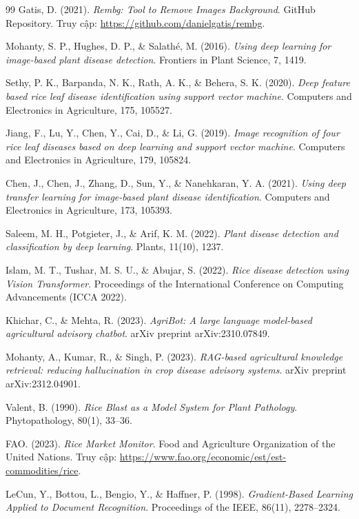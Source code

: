 \documentclass[13pt,a4paper]{extreport}
\begin{document}
\begin{thebibliography}{99}
Gatis, D. (2021). \textit{Rembg: Tool to Remove Images Background}. GitHub Repository. Truy cập: \url{https://github.com/danielgatis/rembg}.

Mohanty, S. P., Hughes, D. P., \& Salath\'e, M. (2016). \textit{Using deep learning for image-based plant disease detection}. Frontiers in Plant Science, 7, 1419.

Sethy, P. K., Barpanda, N. K., Rath, A. K., \& Behera, S. K. (2020). \textit{Deep feature based rice leaf disease identification using support vector machine}. Computers and Electronics in Agriculture, 175, 105527.

Jiang, F., Lu, Y., Chen, Y., Cai, D., \& Li, G. (2019). \textit{Image recognition of four rice leaf diseases based on deep learning and support vector machine}. Computers and Electronics in Agriculture, 179, 105824.

Chen, J., Chen, J., Zhang, D., Sun, Y., \& Nanehkaran, Y. A. (2021). \textit{Using deep transfer learning for image-based plant disease identification}. Computers and Electronics in Agriculture, 173, 105393.

Saleem, M. H., Potgieter, J., \& Arif, K. M. (2022). \textit{Plant disease detection and classification by deep learning}. Plants, 11(10), 1237.

Islam, M. T., Tushar, M. S. U., \& Abujar, S. (2022). \textit{Rice disease detection using Vision Transformer}. Proceedings of the International Conference on Computing Advancements (ICCA 2022).

Khichar, C., \& Mehta, R. (2023). \textit{AgriBot: A large language model-based agricultural advisory chatbot}. arXiv preprint arXiv:2310.07849.

Mohanty, A., Kumar, R., \& Singh, P. (2023). \textit{RAG-based agricultural knowledge retrieval: reducing hallucination in crop disease advisory systems}. arXiv preprint arXiv:2312.04901.

Valent, B. (1990). \textit{Rice Blast as a Model System for Plant Pathology}. Phytopathology, 80(1), 33--36.

FAO. (2023). \textit{Rice Market Monitor}. Food and Agriculture Organization of the United Nations. Truy cập: \url{https://www.fao.org/economic/est/est-commodities/rice}.

LeCun, Y., Bottou, L., Bengio, Y., \& Haffner, P. (1998). \textit{Gradient-Based Learning Applied to Document Recognition}. Proceedings of the IEEE, 86(11), 2278--2324.


\end{thebibliography}
\end{document}
